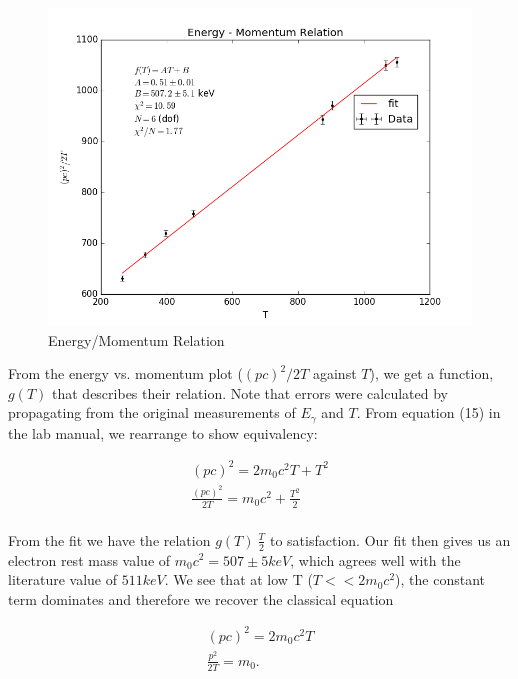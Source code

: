 \documentclass{article}
\begin{document}
\begin{figure}[!htb]
	\centering
	\includegraphics[scale=0.75]{plots/energy_momentum.png}
  	\caption{Energy/Momentum Relation} 
 	\label{calibration}
\end{figure}

From the energy vs. momentum plot ($(pc)^2/2T$ against $T$), we get a function, $g(T)$ that describes their relation. Note that errors were calculated by propagating from the original measurements of $E_\gamma$ and $T$. From equation (15) in the lab manual, we rearrange to show equivalency:

\begin{gather}
	(p c)^2 = 2 m_0 c^2 T + T^2 \\
	\frac{(p c)^2}{2T} = m_0 c^2 + \frac{T^2}{2} \\
\end{gather}

From the fit we have the relation $g(T) ~ \frac{T}{2}$ to satisfaction. Our fit then gives us an electron rest mass value of $m_0 c^2 = 507 \pm 5 keV$, which agrees well with the literature value of $511 keV$. We see that at low T ($T<<2m_0 c^2$), the constant term dominates and therefore we recover the classical equation

\begin{gather}
	(p c)^2 = 2 m_0 c^2 T \\
	\frac{p^2}{2T} = m_0.  \\
\end{gather}
\end{document}
